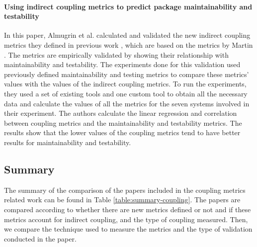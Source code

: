 \paragraph{Using indirect coupling metrics to predict package maintainability and testability \cite{Almugrin2016}}

In this paper, Almugrin et al. calculated and validated the new indirect coupling metrics they defined in previous work \cite{AlmugrinMelton2015}, which are based on the metrics by Martin \cite{martin2002agile}. The metrics are empirically validated by showing their relationship with maintainability and testability. The experiments done for this validation used previously defined maintainability and testing metrics to compare these metrics' values with the values of the indirect coupling metrics. To run the experiments, they used a set of existing tools and one custom tool to obtain all the necessary data and calculate the values of all the metrics for the seven systems involved in their experiment. The authors calculate the linear regression and correlation between coupling metrics and the maintainability and testability metrics. The results show that the lower values of the coupling metrics tend to have better results for maintainability and testability.

\subsection{Summary}

The summary of the comparison of the papers included in the coupling metrics related work can be found in Table \ref{table:summary-coupling}. The papers are compared according to whether there are new metrics defined or not and if these metrics account for indirect coupling, and the type of coupling measured. Then, we compare the technique used to measure the metrics and the type of validation conducted in the paper.

